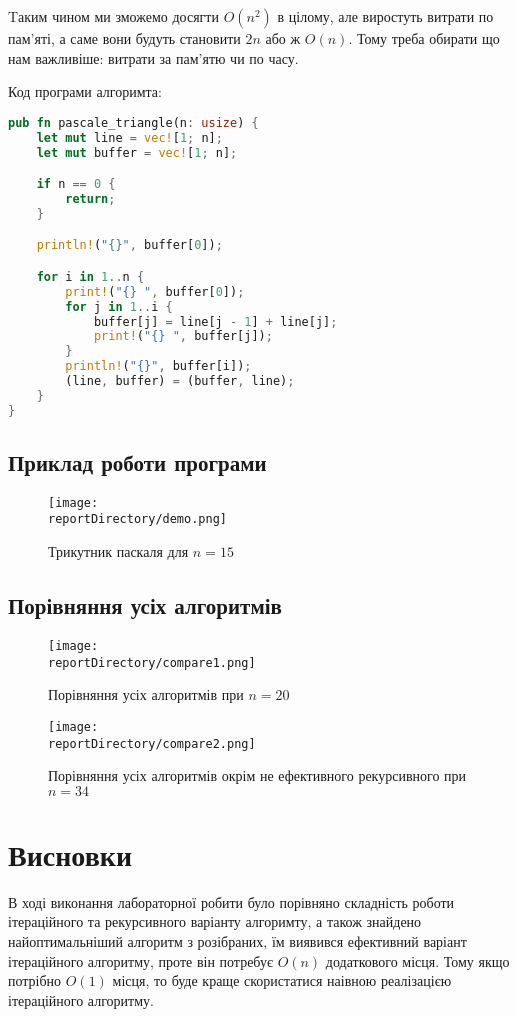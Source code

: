 Tаким чином ми зможемо досягти $O(n^2)$ в цілому, але виростуть витрати по пам'яті, а саме вони будуть становити $2n$ або ж $O(n)$.
Тому треба обирати що нам важливіше: витрати за пам'ятю чи по часу.

\noindent
Код програми алгоримта:
\begin{lstlisting}[language=Rust, style=colouredRust]
pub fn pascale_triangle(n: usize) {
    let mut line = vec![1; n];
    let mut buffer = vec![1; n];

    if n == 0 {
        return;
    }

    println!("{}", buffer[0]);

    for i in 1..n {
        print!("{} ", buffer[0]);
        for j in 1..i {
            buffer[j] = line[j - 1] + line[j];
            print!("{} ", buffer[j]);
        }
        println!("{}", buffer[i]);
        (line, buffer) = (buffer, line);
    }
}
\end{lstlisting}

\subsection{Приклад роботи програми}
\begin{figure}[h!]
    \centering
    \texttt{[image: \\reportDirectory/demo.png]}
    \caption{Трикутник паскаля для $n = 15$}
    \label{fig:task}
\end{figure}


\newpage
\subsection{Порівняння усіх алгоритмів}
\begin{figure}[h!]
    \centering
    \texttt{[image: \\reportDirectory/compare1.png]}
    \caption{Порівняння усіх алгоритмів при $n = 20$}
    \label{fig:task}
\end{figure}

\begin{figure}[h!]
    \centering
    \texttt{[image: \\reportDirectory/compare2.png]}
    \caption{Порівняння усіх алгоритмів окрім не ефективного рекурсивного при\\$n = 34$}
    \label{fig:task}
\end{figure}


\newpage
\section{Висновки}
В ході виконання лабораторної робити було порівняно складність роботи ітераційного та рекурсивного варіанту алгоримту,
а також знайдено найоптимальніший алгоритм з розібраних, їм виявився ефективний варіант ітераційного алгоритму,
проте він потребує $O(n)$ додаткового місця. Тому якщо потрібно $O(1)$ місця,
то буде краще скористатися наівною реалізацією ітераційного алгоритму. 
